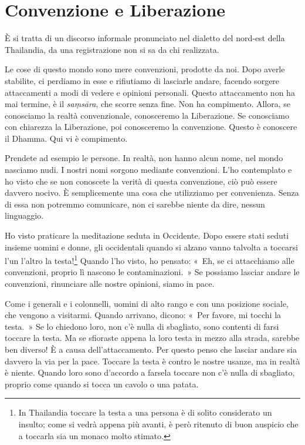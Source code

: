 \chapter{Convenzione e Liberazione}

\begin{openingQuote}
  \centering

  È si tratta di un discorso informale pronunciato nel dialetto del nord-est della
  Thailandia, da una registrazione non si sa da chi realizzata.
\end{openingQuote}

Le cose di questo mondo sono mere convenzioni, prodotte da noi. Dopo
averle stabilite, ci perdiamo in esse e rifiutiamo di lasciarle andare,
facendo sorgere attaccamenti a modi di vedere e opinioni personali.
Questo attaccamento non ha mai termine, è il \emph{saṃsāra}, che scorre
senza fine. Non ha compimento. Allora, se conosciamo la realtà
convenzionale, conosceremo la Liberazione. Se conosciamo con chiarezza
la Liberazione, poi conosceremo la convenzione. Questo è conoscere il
Dhamma. Qui vi è compimento.

Prendete ad esempio le persone. In realtà, non hanno alcun nome, nel
mondo nasciamo nudi. I nostri nomi sorgono mediante convenzioni. L'ho
contemplato e ho visto che se non conoscete la verità di questa
convenzione, ciò può essere davvero nocivo. È semplicemente una cosa che
utilizziamo per convenienza. Senza di essa non potremmo comunicare, non
ci sarebbe niente da dire, nessun linguaggio.

Ho visto praticare la meditazione seduta in Occidente. Dopo essere stati
seduti insieme uomini e donne, gli occidentali quando si alzano vanno
talvolta a toccarsi l'un l'altro la testa!\footnote{In Thailandia
  toccare la testa a una persona è di solito considerato un insulto;
  come si vedrà appena più avanti, è però ritenuto di buon auspicio che
  a toccarla sia un monaco molto stimato.} Quando l'ho visto, ho
pensato: «~Eh, se ci attacchiamo alle convenzioni, proprio lì nascono le
contaminazioni.~» Se possiamo lasciar andare le convenzioni, rinunciare
alle nostre opinioni, siamo in pace.

Come i generali e i colonnelli, uomini di alto rango e con una posizione
sociale, che vengono a visitarmi. Quando arrivano, dicono: «~Per favore,
mi tocchi la testa.~» Se lo chiedono loro, non c'è nulla di sbagliato,
sono contenti di farsi toccare la testa. Ma se sfioraste appena la loro
testa in mezzo alla strada, sarebbe ben diverso! È a causa
dell'attaccamento. Per questo penso che lasciar andare sia davvero la
via per la pace. Toccare la testa è contro le nostre usanze, ma in
realtà è niente. Quando loro sono d'accordo a farsela toccare non c'è
nulla di sbagliato, proprio come quando si tocca un cavolo o una patata.

